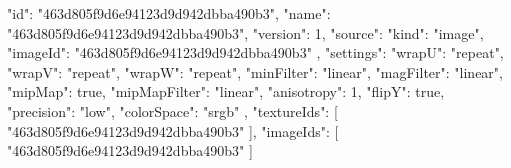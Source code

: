 {
  "id": "463d805f9d6e94123d9d942dbba490b3",
  "name": "463d805f9d6e94123d9d942dbba490b3",
  "version": 1,
  "source": {
    "kind": "image",
    "imageId": "463d805f9d6e94123d9d942dbba490b3"
  },
  "settings": {
    "wrapU": "repeat",
    "wrapV": "repeat",
    "wrapW": "repeat",
    "minFilter": "linear",
    "magFilter": "linear",
    "mipMap": true,
    "mipMapFilter": "linear",
    "anisotropy": 1,
    "flipY": true,
    "precision": "low",
    "colorSpace": "srgb"
  },
  "textureIds": [
    "463d805f9d6e94123d9d942dbba490b3"
  ],
  "imageIds": [
    "463d805f9d6e94123d9d942dbba490b3"
  ]
}
